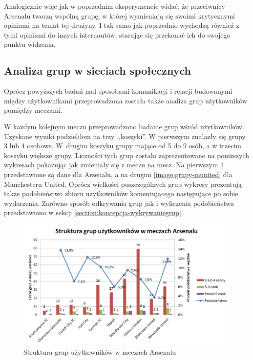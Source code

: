 Analogicznie więc jak w poprzednim eksperymencie widać, że przeciwnicy
Arsenalu tworzą wspólną grupę, w której wymieniają się swoimi
krytycznymi opiniami na temat tej drużyny. I tak samo jak poprzednio
wychodzą również z tymi opiniami do innych internautów, starając się
przekonać ich do swojego punktu widzenia.
















\subsection{Analiza grup w sieciach społecznych}

Oprócz powyższych badań nad sposobami komunikacji i relacji budowanymi między
użytkownikami przeprowadzona została także analiza grup użytkowników 
pomiędzy meczami. 

W każdym kolejnym meczu przeprowadzono badanie grup wśród użytkowników.
Uzyskane wyniki podzieliłem na trzy ,,koszyki''. W pierwszym znalazły się grupy 
3 lub 4 osobowe. W~drugim koszyku grupy mające od 5 do 9 osób, a w trzecim koszyku
większe grupy. Liczności tych grup zostało zaprezentowane na poniższych
wykresach pokazując jak zmieniały się z meczu na mecz.
Na pierwszym \ref{image:grupy-arsenal} przedstawione są dane
dla Arsenalu, a na drugim \ref{image:grupy-munited} dla Manchesteru United.
Oprócz wielkości poszczególnych grup wykresy prezentują także podobieństwo
zbioru użytkowników komentującego następujące po sobie wydarzenia.
Zarówno sposób odkrywania grup jak i wyliczenia podobieństwa przedstawiono
w sekcji \ref{section:koncepcja-wykrywaniegrup}.  
 
\begin{figure}[ht!]
\centering
\includegraphics[width=160mm]{img/grupy-arsenal-nums.png}
\caption{Struktura grup użytkowników w meczach Arsenalu}
\label{image:grupy-arsenal}
\end{figure}

